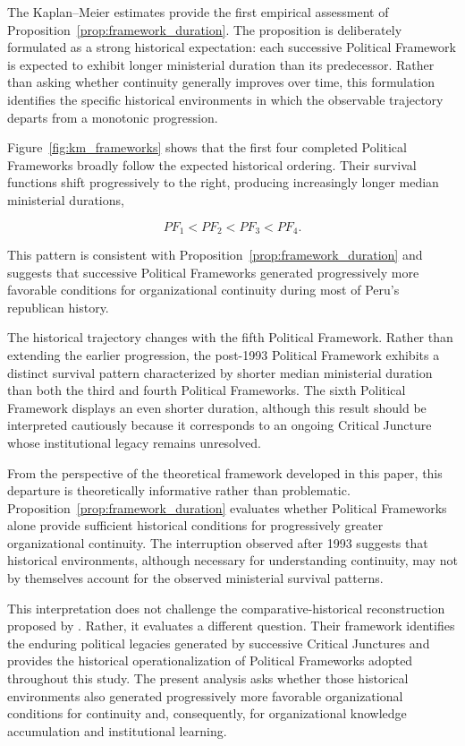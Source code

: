 \documentclass[doc, 12pt, a4paper,floatsintext]{apa7}
\begin{document}
The Kaplan--Meier estimates provide the first empirical assessment of Proposition~\ref{prop:framework_duration}. The proposition is deliberately formulated as a strong historical expectation: each successive Political Framework is expected to exhibit longer ministerial duration than its predecessor. Rather than asking whether continuity generally improves over time, this formulation identifies the specific historical environments in which the observable trajectory departs from a monotonic progression.

Figure~\ref{fig:km_frameworks} shows that the first four completed Political Frameworks broadly follow the expected historical ordering. Their survival functions shift progressively to the right, producing increasingly longer median ministerial durations,

\[
PF_1 < PF_2 < PF_3 < PF_4.
\]

This pattern is consistent with Proposition~\ref{prop:framework_duration} and suggests that successive Political Frameworks generated progressively more favorable conditions for organizational continuity during most of Peru's republican history.

The historical trajectory changes with the fifth Political Framework. Rather than extending the earlier progression, the post-1993 Political Framework exhibits a distinct survival pattern characterized by shorter median ministerial duration than both the third and fourth Political Frameworks. The sixth Political Framework displays an even shorter duration, although this result should be interpreted cautiously because it corresponds to an ongoing Critical Juncture whose institutional legacy remains unresolved.

From the perspective of the theoretical framework developed in this paper, this departure is theoretically informative rather than problematic. Proposition~\ref{prop:framework_duration} evaluates whether Political Frameworks alone provide sufficient historical conditions for progressively greater organizational continuity. The interruption observed after 1993 suggests that historical environments, although necessary for understanding continuity, may not by themselves account for the observed ministerial survival patterns.

This interpretation does not challenge the comparative-historical reconstruction proposed by \textcite{lopez_jimenez_peru_2025}. Rather, it evaluates a different question. Their framework identifies the enduring political legacies generated by successive Critical Junctures and provides the historical operationalization of Political Frameworks adopted throughout this study. The present analysis asks whether those historical environments also generated progressively more favorable organizational conditions for continuity and, consequently, for organizational knowledge accumulation and institutional learning.
\end{document}
